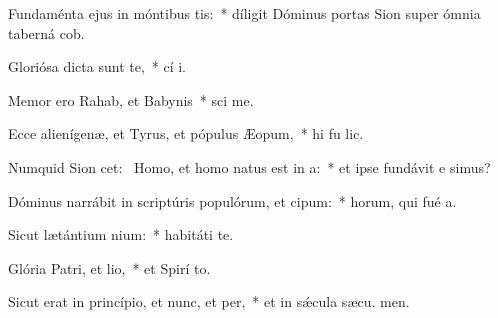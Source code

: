 \item Fundaménta ejus in móntibus tis:~* díligit Dóminus portas Sion super ómnia taberná cob.
\item Gloriósa dicta sunt  te,~* cí i.
\item Memor ero Rahab, et Babynis~* sci me.
\item Ecce alienígenæ, et Tyrus, et pópulus Æopum,~* hi fu lic.
\item Numquid Sion cet:~\pscross{} Homo, et homo natus est in a:~* et ipse fundávit e simus?
\item Dóminus narrábit in scriptúris populórum, et cipum:~* horum, qui fué  a.
\item Sicut lætántium nium:~* habitáti   te.
\item Glória Patri, et lio,~* et Spirí to.
\item Sicut erat in princípio, et nunc, et per,~* et in sǽcula sæcu. men.
